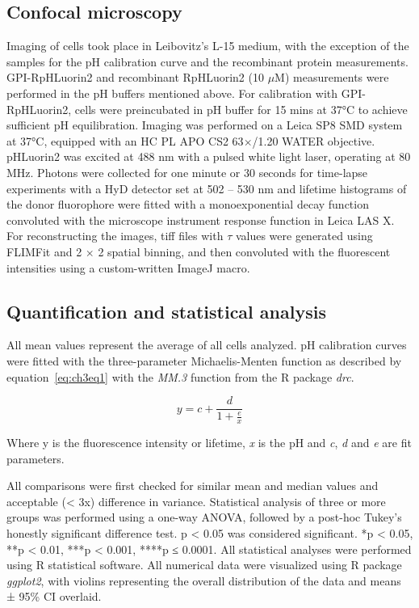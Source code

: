 \subsection{Confocal microscopy}
Imaging of cells took place in Leibovitz’s L-15 medium, with the exception of the samples for the pH calibration curve and the recombinant protein measurements. GPI-RpHLuorin2 and recombinant RpHLuorin2 (10 $\mu$M) measurements were performed in the pH buffers mentioned above. For calibration with GPI-RpHLuorin2, cells were preincubated in pH buffer for 15 mins at 37°C to achieve sufficient pH equilibration. Imaging was performed on a Leica SP8 SMD system at 37°C, equipped with an HC PL APO CS2 63$\times$/1.20 WATER objective. pHLuorin2 was excited at 488 nm with a pulsed white light laser, operating at 80 MHz. Photons were collected for one minute or 30 seconds for time-lapse experiments with a HyD detector set at 502 – 530 nm and lifetime histograms of the donor fluorophore were fitted with a monoexponential decay function convoluted with the microscope instrument response function in Leica LAS X. For reconstructing the images, tiff files with $\tau$ values were generated using FLIMFit\cite{warren_rapid_2013} and 2 $\times$ 2 spatial binning, and then convoluted with the fluorescent intensities using a custom-written ImageJ macro.

\subsection{Quantification and statistical analysis}
All mean values represent the average of all cells analyzed. pH calibration curves were fitted with the three-parameter Michaelis-Menten function as described by equation~\ref{eq:ch3eq1} with the \emph{MM.3} function from the R package \emph{drc}\cite{ritz_dose-response_2015}.

\begin{equation}
    y = c + \frac{d}{1 + \frac{e}{x}}
    \label{eq:ch3eq1}
\end{equation}

Where y is the fluorescence intensity or lifetime, \emph{x} is the pH and \emph{c}, \emph{d} and \emph{e} are fit parameters.

All comparisons were first checked for similar mean and median values and acceptable (< 3x) difference in variance. Statistical analysis of three or more groups was performed using a one-way ANOVA, followed by a post-hoc Tukey’s honestly significant difference test. p < 0.05 was considered significant. *p < 0.05, **p < 0.01, ***p < 0.001, ****p ≤ 0.0001. All statistical analyses were performed using R statistical software. All numerical data were visualized using R package \emph{ggplot2}\cite{wickham_ggplot2:_2016}, with violins representing the overall distribution of the data and means ± 95\% CI overlaid. 

